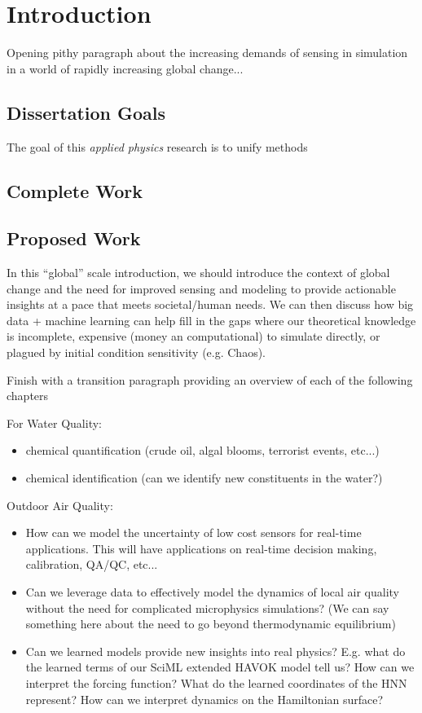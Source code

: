 \chapter{Introduction}


Opening pithy paragraph about the increasing demands of sensing in simulation in a world of rapidly increasing global change...

\section{Dissertation Goals}

The goal of this \textit{applied physics} research is to unify methods

\section{Complete Work}

\section{Proposed Work}


In this ``global'' scale introduction, we should introduce the context of global change and the need for improved sensing and modeling to provide actionable insights at a pace that meets societal/human needs. We can then discuss how big data + machine learning can help fill in the gaps where our theoretical knowledge is incomplete, expensive (money an computational) to simulate directly, or plagued by initial condition sensitivity (e.g. Chaos).

Finish with a transition paragraph providing an overview of each of the following chapters

For Water Quality:
\begin{itemize}
\item chemical quantification (crude oil, algal blooms, terrorist events, etc...)
\item chemical identification (can we identify new constituents in the water?)
\end{itemize}

Outdoor Air Quality:
\begin{itemize}
\item How can we model the uncertainty of low cost sensors for real-time applications. This will have applications on real-time decision making, calibration, QA/QC, etc...
\item Can we leverage data to effectively model the dynamics of local air quality without the need for complicated microphysics simulations? (We can say something here about the need to go beyond thermodynamic equilibrium)
\item Can we learned models provide new insights into real physics? E.g. what do the learned terms of our SciML extended HAVOK model tell us? How can we interpret the forcing function? What do the learned coordinates of the HNN represent? How can we interpret dynamics on the Hamiltonian surface?
\end{itemize}


